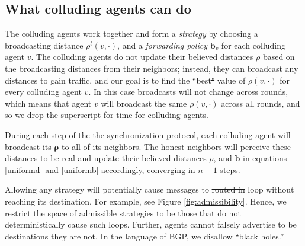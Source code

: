 \documentclass{comnet}
\providecommand{\DIFadd}[1]{{\protect\color{blue}\uwave{#1}}} %
\providecommand{\DIFdel}[1]{{\protect\color{red}\sout{#1}}}                      %
\providecommand{\DIFaddbegin}{} %
\providecommand{\DIFaddend}{} %
\providecommand{\DIFdelbegin}{} %
\providecommand{\DIFdelend}{} %
\begin{document}

\subsection{What colluding agents can do}
\label{sec:uniform-nonuniform-models}

The colluding agents work together and form a \emph{strategy} by choosing a
broadcasting distance $\rho^t(v,\cdot)$,  and a {\it forwarding policy}
$\mathbf{b}_{v}$ for each colluding agent $v$. The colluding agents do not
update their believed distances $\rho$ based on the broadcasting distances from
their neighbors; instead, they can broadcast any distances to gain traffic, and
our goal is to find the ``best\DIFdelbegin \DIFdel{" }\DIFdelend \DIFaddbegin \DIFadd{'' }\DIFaddend value of $\rho(v,\cdot)$ for every colluding
agent $v$. In this case broadcasts will not change across rounds, which means
that agent $v$ will broadcast the same $\rho(v,\cdot)$  across all rounds, and
so we drop the superscript for time for colluding agents.  

During each step of the the synchronization protocol, each colluding agent will
broadcast its $\mathbf{\rho}$ to all of its neighbors. The honest neighbors
will perceive these distances to be real and update their believed distances
$\rho$, and $\mathbf{b}$ in equations \ref{uniformd} and \ref{uniformb}
accordingly, converging in $n-1$ steps. 

Allowing any strategy will potentially cause messages to \DIFdelbegin \DIFdel{routed in }\DIFdelend \DIFaddbegin \DIFadd{route in a }\DIFaddend loop
without reaching its destination. For example, see Figure
\ref{fig:admissibility}. Hence, we restrict the space of admissible strategies
to be those that do not deterministically cause such loops. Further, agents
cannot falsely advertise to be destinations they are not. In the language of
BGP, we disallow ``black holes.'' 
\end{document}
